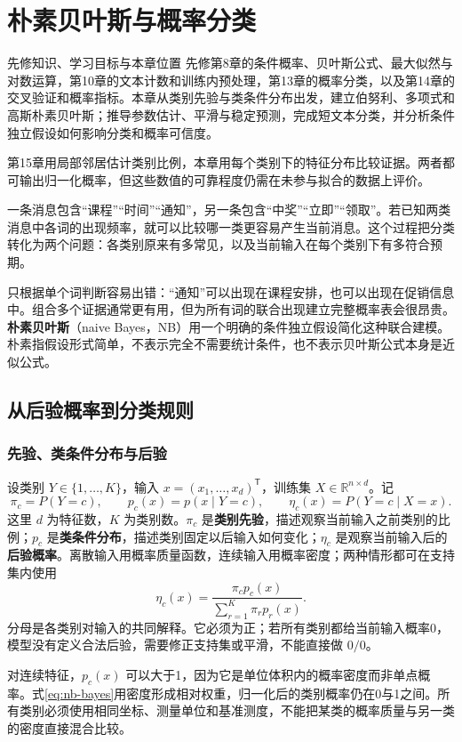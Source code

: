 \documentclass[UTF8,fontset=none,zihao=-4,a4paper]{ctexart}
\newcommand{\chapterpage}[1]{\clearpage\section{#1}}
\newcommand{\term}[1]{\textbf{#1}}
\numberwithin{equation}{section}
\numberwithin{figure}{section}
\begin{document}
\chapterpage{朴素贝叶斯与概率分类}\label{ch:naivebayes}
\begin{infobox}{先修知识、学习目标与本章位置}
先修第8章的条件概率、贝叶斯公式、最大似然与对数运算，第10章的文本计数和训练内预处理，第13章的概率分类，以及第14章的交叉验证和概率指标。本章从类别先验与类条件分布出发，建立伯努利、多项式和高斯朴素贝叶斯；推导参数估计、平滑与稳定预测，完成短文本分类，并分析条件独立假设如何影响分类和概率可信度。

第15章用局部邻居估计类别比例，本章用每个类别下的特征分布比较证据。两者都可输出归一化概率，但这些数值的可靠程度仍需在未参与拟合的数据上评价。
\end{infobox}
一条消息包含“课程”“时间”“通知”，另一条包含“中奖”“立即”“领取”。若已知两类消息中各词的出现频率，就可以比较哪一类更容易产生当前消息。这个过程把分类转化为两个问题：各类别原来有多常见，以及当前输入在每个类别下有多符合预期。

只根据单个词判断容易出错：“通知”可以出现在课程安排，也可以出现在促销信息中。组合多个证据通常更有用，但为所有词的联合出现建立完整概率表会很昂贵。\term{朴素贝叶斯}（naive Bayes，NB）用一个明确的条件独立假设简化这种联合建模。朴素指假设形式简单，不表示完全不需要统计条件，也不表示贝叶斯公式本身是近似公式。

\subsection{从后验概率到分类规则}
\subsubsection{先验、类条件分布与后验}
设类别 $Y\in\{1,\ldots,K\}$，输入 $x=(x_1,\ldots,x_d)^{\mathsf T}$，训练集 $X\in\mathbb R^{n\times d}$。记
\[
 \pi_c=P(Y=c),\qquad p_c(x)=p(x\mid Y=c),\qquad
 \eta_c(x)=P(Y=c\mid X=x).
\]
这里 $d$ 为特征数，$K$ 为类别数。$\pi_c$ 是\term{类别先验}，描述观察当前输入之前类别的比例；$p_c$ 是\term{类条件分布}，描述类别固定以后输入如何变化；$\eta_c$ 是观察当前输入后的\term{后验概率}。离散输入用概率质量函数，连续输入用概率密度；两种情形都可在支持集内使用
\begin{equation}\label{eq:nb-bayes}
 \eta_c(x)=\frac{\pi_c p_c(x)}{\sum_{r=1}^K\pi_r p_r(x)}.
\end{equation}
分母是各类别对输入的共同解释。它必须为正；若所有类别都给当前输入概率0，模型没有定义合法后验，需要修正支持集或平滑，不能直接做 $0/0$。

对连续特征，$p_c(x)$ 可以大于1，因为它是单位体积内的概率密度而非单点概率。式\eqref{eq:nb-bayes}用密度形成相对权重，归一化后的类别概率仍在0与1之间。所有类别必须使用相同坐标、测量单位和基准测度，不能把某类的概率质量与另一类的密度直接混合比较。
\end{document}
